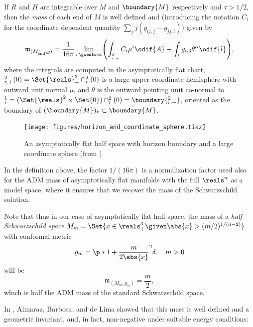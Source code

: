 \documentclass[titlepage,numbers=noenddot,headinclude,oneside,%
footinclude=true,cleardoublepage=empty,%
BCOR=5mm,paper=a4,fontsize=11pt,%
english,%
]{scrartcl}
\let\sphere\relax
\newcommand{\sphere}{\mathbb{S}}
\newcommand{\mass}[2]{\mathfrak{m}_{(#1,#2)}} %
\begin{document}
\begin{definition}\label{def:half_space_mass}
    If \( R \) and \( H \) are integrable over \( M \) and \( \boundary{M} \) respectively and \( \tau>1/2 \), then the \emph{mass} of each end of \( M \) is well defined and (introducing the notation \( C_i \) for the coordinate dependent quantity \( \sum_jj (g_{ij,j}-g_{jj,i}) \)) given by
    \begin{equation*}
        \mass{M_{\mathrm{end}}^i}{g}=\frac{1}{16\pi}\lim_{r \goesto \infty}\Biggl(\int_{\sphere_{r,+}^{2}}C_i\mu^i\odif{A}+\int_{\sphere_r^{1}}g_{\alpha 3}\theta^\alpha\odif{l}\Biggr),
    \end{equation*}
    where the integrals are computed in the asymptotically flat chart, \( \sphere_{r,+}^{2}(0)=\Set{\reals}^3_+\cap \sphere_r^2(0) \) is a large upper coordinate hemisphere with outward unit normal \( \mu \), and \( \theta \) is the outward pointing unit co-normal to \( \sphere_{r}^1=(\Set{\reals}^2\times \Set{0})\cap \sphere_r^2(0)=\boundary{\sphere_{r,+}^2} \), oriented as the boundary of \( (\boundary{M})_r\subset \boundary{M} \).
\end{definition}
\begin{figure}[H]
    \centering
    \texttt{[image: figures/horizon\_and\_coordinate\_sphere.tikz]}
    \caption{An asymptotically flat half space with horizon boundary and a large coordinate sphere (from )}
    \label{fig:horizon_and_coordinate_spher}
\end{figure}
\begin{remark}
    In the definition above, the factor \( 1/(16\pi) \)  is a normalization factor used also for the ADM mass of asymptotically flat manifolds with the full \( \reals^n \) as a model space, where it ensures that we recover the mass of the Schwarzschild solution. 
    
    Note that thus in our case of asymptotically flat half-space, the mass of a \emph{half Schwarzschild space} \( M_m=\Set{x\in \reals^3_+\given \abs{x}>(m/2)^{1/(n-2)}} \) with conformal metric
    \begin{equation*}
        g_m=\p*{1+\frac{m}{2\abs{x}}}^{2}\delta,\quad m>0
    \end{equation*}
    will be
    \begin{equation*}
        \mass{M_m}{g_m}=\frac{m}{2},
    \end{equation*}
    which is half the ADM mass of the standard Schwarzschild space.
\end{remark}
In \cite{almarazPositiveMassTheorem2016}, Almaraz, Barbosa, and de Lima showed that this mass is well defined and a geometric invariant, and, in fact, non-negative under suitable energy conditions:
\end{document}
